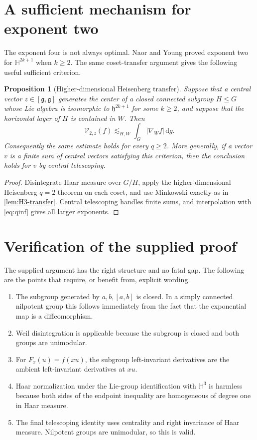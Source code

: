 \documentclass[11pt]{article}
\newtheorem{proposition}[theorem]{Proposition}
\theoremstyle{remark}
\newcommand{\g}{\mathfrak g}
\newcommand{\dd}{\,\mathrm d}
\newcommand{\abs}[1]{\lvert #1\rvert}
\begin{document}
\section{A sufficient mechanism for exponent two}
The exponent four is not always optimal.  Naor and Young proved exponent two for
\(\mathbb H^{2k+1}\) when \(k\ge2\).  The same coset-transfer argument gives the
following useful sufficient criterion.

\begin{proposition}[Higher-dimensional Heisenberg transfer]\label{prop:q2}
Suppose that a central vector \(z\in[\g,\g]\) generates the center of a closed connected
subgroup \(H\le G\) whose Lie algebra is isomorphic to \(\mathfrak h^{2k+1}\) for some
\(k\ge2\), and suppose that the horizontal layer of \(H\) is contained in \(W\).  Then
\[
 \mathcal V_{2,z}(f)\lesssim_{H,W}
 \int_G\abs{\nabla_Wf}\dd g.
\]
Consequently the same estimate holds for every \(q\ge2\).  More generally, if a vector
\(v\) is a finite sum of central vectors satisfying this criterion, then the conclusion
holds for \(v\) by central telescoping.
\end{proposition}

\begin{proof}
Disintegrate Haar measure over \(G/H\), apply the higher-dimensional Heisenberg
\(q=2\) theorem on each coset, and use Minkowski exactly as in
\cref{lem:H3-transfer}.  Central telescoping handles finite sums, and interpolation with
\eqref{eq:qinf} gives all larger exponents.
\end{proof}

\section{Verification of the supplied proof}
The supplied argument has the right structure and no fatal gap.  The following are the
points that require, or benefit from, explicit wording.

\begin{enumerate}
\item The subgroup generated by \(a,b,[a,b]\) is closed.  In a simply connected
nilpotent group this follows immediately from the fact that the exponential map is a
diffeomorphism.
\item Weil disintegration is applicable because the subgroup is closed and both groups
are unimodular.
\item For \(F_x(u)=f(xu)\), the subgroup left-invariant derivatives are the ambient
left-invariant derivatives at \(xu\).
\item Haar normalization under the Lie-group identification with \(\mathbb H^3\) is
harmless because both sides of the endpoint inequality are homogeneous of degree one
in Haar measure.
\item The final telescoping identity uses centrality and right invariance of Haar measure.
Nilpotent groups are unimodular, so this is valid.
\end{enumerate}
\end{document}
